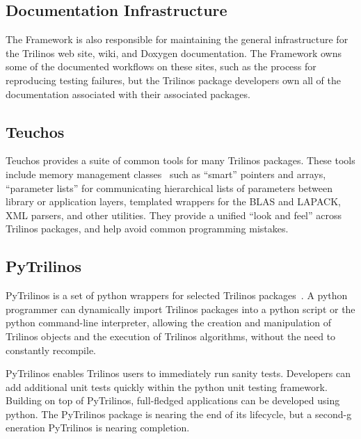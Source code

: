 \subsection{Documentation Infrastructure}

The Framework is also responsible for maintaining the general infrastructure for the Trilinos web site, wiki, and Doxygen documentation. The Framework owns some of the documented workflows on these sites, such as the process for reproducing testing failures, but the Trilinos package developers own all of the documentation associated with their associated packages.

\subsection{Teuchos}

Teuchos provides a suite of common tools for many Trilinos packages. These tools include memory management classes~\cite{bartlett2010} such as ``smart'' pointers and arrays, ``parameter lists'' for communicating hierarchical lists of parameters between library or application layers, templated wrappers for the BLAS and LAPACK, XML parsers, and other utilities. They provide a unified ``look and feel'' across Trilinos packages, and help avoid common programming mistakes.

\subsection{PyTrilinos}

PyTrilinos is a set of python wrappers for selected Trilinos packages~\cite{PyTrilinos}. A python programmer can dynamically import Trilinos packages into a python script or the python command-line interpreter, allowing the creation and manipulation of Trilinos objects and the execution of Trilinos algorithms, without the need to constantly recompile.

PyTrilinos enables Trilinos users to immediately run sanity tests. Developers can add additional unit tests quickly within the python unit testing framework. Building on top of PyTrilinos, full-fledged applications can be developed using python. The PyTrilinos package is nearing the end of its lifecycle, but a second-g
eneration PyTrilinos is nearing completion.


